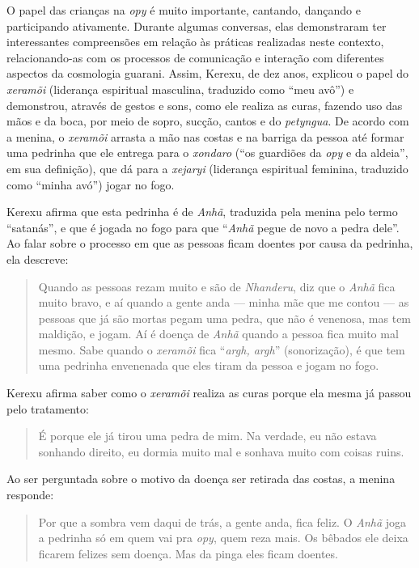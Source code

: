 O papel das crianças na \emph{opy} é muito importante, cantando, dançando e
participando ativamente. Durante algumas conversas, elas demonstraram
ter interessantes compreensões em relação às práticas realizadas neste
contexto, relacionando-as com os processos de comunicação e interação
com diferentes aspectos da cosmologia guarani. Assim, Kerexu, de dez
anos, explicou o papel do \emph{xeramõi} (liderança espiritual masculina,
traduzido como ``meu avô'') e demonstrou, através de gestos e sons, como
ele realiza as curas, fazendo uso das mãos e da boca, por meio de
sopro, sucção, cantos e do \emph{petyngua}. De acordo com a menina, o \emph{xeramõi}
arrasta a mão nas costas e na barriga da pessoa até formar uma pedrinha
que ele entrega para o \emph{xondaro}  (``os guardiões da \emph{opy} e da aldeia'', em
sua definição), que dá para a \emph{xejaryi} (liderança espiritual feminina,
traduzido como ``minha avó'') jogar no fogo. 

Kerexu afirma que esta pedrinha é de \emph{Anhã}, traduzida pela menina pelo
termo ``satanás'', e que é jogada no fogo para que ``\emph{Anhã} pegue de novo a
pedra dele''. Ao falar sobre o processo em que as pessoas ficam doentes
por causa da pedrinha, ela descreve:

\begin{quotation}
Quando as pessoas rezam muito e são de \emph{Nhanderu}, diz que o \emph{Anhã} fica
muito bravo, e aí quando a gente anda --- minha mãe que me contou --- as
pessoas que já são mortas pegam uma pedra, que não é venenosa, mas tem
maldição, e jogam. Aí é doença de \emph{Anhã} quando a pessoa fica muito mal
mesmo. Sabe quando o \emph{xeramõi} fica ``\emph{argh, argh}'' (sonorização), é que tem
uma pedrinha envenenada que eles tiram da pessoa e jogam no fogo.
\end{quotation}

Kerexu afirma saber como o \emph{xeramõi} realiza as curas porque ela mesma já
passou pelo tratamento:

\begin{quotation}
É porque ele já tirou uma pedra de mim. Na verdade, eu não estava
sonhando direito, eu dormia muito mal e sonhava muito com coisas ruins.
\end{quotation}

Ao ser perguntada sobre o motivo da doença ser retirada das costas, a
menina responde:

\begin{quotation}
Por que a sombra vem daqui de trás, a gente anda, fica feliz. O \emph{Anhã}
joga a pedrinha só em quem vai pra \emph{opy}, quem reza mais. Os bêbados ele
deixa ficarem felizes sem doença. Mas da pinga eles ficam doentes.
\end{quotation}

